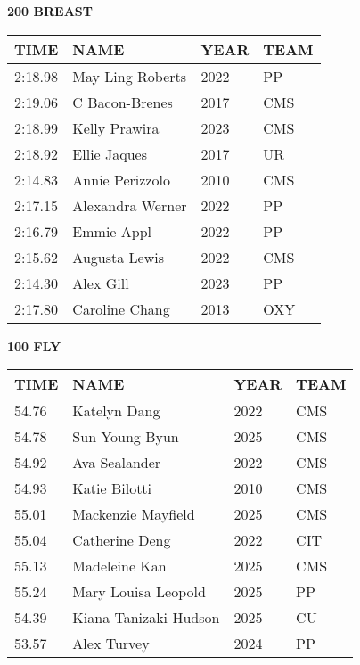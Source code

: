 \vspace{0.4cm}

\begin{minipage}[t]{0.48\textwidth}
\centering
\textbf{200 BREAST}\\[0.05cm]
\begin{tabular}{@{}p{1.8cm}p{2.8cm}p{1.2cm}p{1.4cm}@{}}
\hline
\textbf{TIME} & \textbf{NAME} & \textbf{YEAR} & \textbf{TEAM} \\
\hline
2:18.98 & May Ling Roberts & 2022 & PP \\
2:19.06 & C Bacon-Brenes & 2017 & CMS \\
2:18.99 & Kelly Prawira & 2023 & CMS \\
2:18.92 & Ellie Jaques & 2017 & UR \\
2:14.83 & Annie Perizzolo & 2010 & CMS \\
2:17.15 & Alexandra Werner & 2022 & PP \\
2:16.79 & Emmie Appl & 2022 & PP \\
2:15.62 & Augusta Lewis & 2022 & CMS \\
2:14.30 & Alex Gill & 2023 & PP \\
2:17.80 & Caroline Chang & 2013 & OXY \\
\hline
\end{tabular}
\end{minipage}\hfill
\begin{minipage}[t]{0.48\textwidth}
\centering
\textbf{100 FLY}\\[0.05cm]
\begin{tabular}{@{}p{1.8cm}p{2.8cm}p{1.2cm}p{1.4cm}@{}}
\hline
\textbf{TIME} & \textbf{NAME} & \textbf{YEAR} & \textbf{TEAM} \\
\hline
54.76 & Katelyn Dang & 2022 & CMS \\
54.78 & Sun Young Byun & 2025 & CMS \\
54.92 & Ava Sealander & 2022 & CMS \\
54.93 & Katie Bilotti & 2010 & CMS \\
55.01 & Mackenzie Mayfield & 2025 & CMS \\
55.04 & Catherine Deng & 2022 & CIT \\
55.13 & Madeleine Kan & 2025 & CMS \\
55.24 & Mary Louisa Leopold & 2025 & PP \\
54.39 & Kiana Tanizaki-Hudson & 2025 & CU \\
53.57 & Alex Turvey & 2024 & PP \\
\hline
\end{tabular}
\end{minipage}

